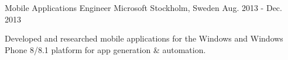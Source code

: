 \begin{cventries}
  \cventry
    {Mobile Applications Engineer} %
    {Microsoft} %
    {Stockholm, Sweden} %
    {Aug. 2013 - Dec. 2013} %
    {
      \begin{cvitems} %
        \item {Developed and researched mobile applications for the Windows and Windows Phone 8/8.1 platform for app generation \& automation.}
      \end{cvitems}
    }

\end{cventries}
